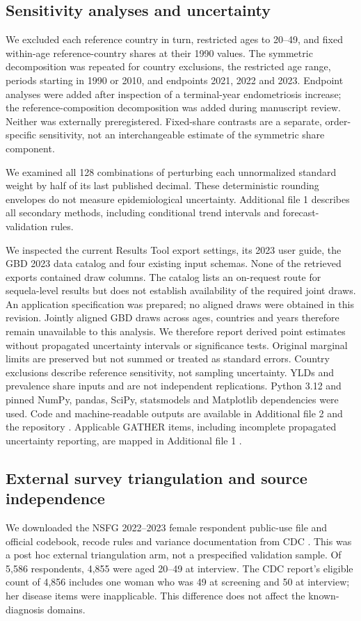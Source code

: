 \documentclass[11pt,a4paper]{article}
\begin{document}
\subsection{Sensitivity analyses and uncertainty}
We excluded each reference country in turn, restricted ages to 20--49, and fixed within-age reference-country shares at their 1990 values. The symmetric decomposition was repeated for country exclusions, the restricted age range, periods starting in 1990 or 2010, and endpoints 2021, 2022 and 2023. Endpoint analyses were added after inspection of a terminal-year endometriosis increase; the reference-composition decomposition was added during manuscript review. Neither was externally preregistered. Fixed-share contrasts are a separate, order-specific sensitivity, not an interchangeable estimate of the symmetric share component.

We examined all 128 combinations of perturbing each unnormalized standard weight by half of its last published decimal. These deterministic rounding envelopes do not measure epidemiological uncertainty. Additional file 1 describes all secondary methods, including conditional trend intervals and forecast-validation rules.

We inspected the current Results Tool export settings, its 2023 user guide, the GBD 2023 data catalog and four existing input schemas. None of the retrieved exports contained draw columns. The catalog lists an on-request route for sequela-level results but does not establish availability of the required joint draws. An application specification was prepared; no aligned draws were obtained in this revision. Jointly aligned GBD draws across ages, countries and years therefore remain unavailable to this analysis. We therefore report derived point estimates without propagated uncertainty intervals or significance tests. Original marginal limits are preserved but not summed or treated as standard errors. Country exclusions describe reference sensitivity, not sampling uncertainty. YLDs and prevalence share inputs and are not independent replications. Python 3.12 and pinned NumPy, pandas, SciPy, statsmodels and Matplotlib dependencies were used. Code and machine-readable outputs are available in Additional file 2 and the repository \cite{repository}. Applicable GATHER items, including incomplete propagated uncertainty reporting, are mapped in Additional file 1 \cite{gather}.

\subsection{External survey triangulation and source independence}
We downloaded the NSFG 2022--2023 female respondent public-use file and official codebook, recode rules and variance documentation from CDC \cite{nsfg}. This was a post hoc external triangulation arm, not a prespecified validation sample. Of 5,586 respondents, 4,855 were aged 20--49 at interview. The CDC report's eligible count of 4,856 includes one woman who was 49 at screening and 50 at interview; her disease items were inapplicable. This difference does not affect the known-diagnosis domains.
\end{document}

